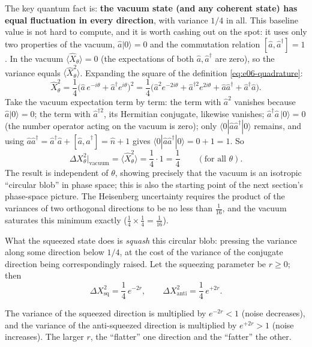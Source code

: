 The key quantum fact is: \textbf{the vacuum state (and any coherent state) has equal fluctuation in every direction}, with variance \(1/4\) in all. This baseline value is not hard to compute, and it is worth cashing out on the spot: it uses only two properties of the vacuum, \(\hat a|0\rangle=0\) and the commutation relation \([\hat a,\hat a^\dagger]=1\). In the vacuum \(\langle\hat X_\theta\rangle=0\) (the expectations of both \(\hat a,\hat a^\dagger\) are zero), so the variance equals \(\langle\hat X_\theta^2\rangle\). Expanding the square of the definition \eqref{eq:e06-quadrature}:
\[
  \hat X_\theta^{2}
  =\frac14\big(\hat a\,e^{-i\theta}+\hat a^\dagger e^{i\theta}\big)^2
  =\frac14\big(\hat a^2 e^{-2i\theta}+\hat a^{\dagger 2}e^{2i\theta}
     +\hat a\hat a^\dagger+\hat a^\dagger\hat a\big).
\]
Take the vacuum expectation term by term: the term with \(\hat a^2\) vanishes because \(\hat a|0\rangle=0\); the term with \(\hat a^{\dagger2}\), its Hermitian conjugate, likewise vanishes; \(\hat a^\dagger\hat a\,|0\rangle=0\) (the number operator acting on the vacuum is zero); only \(\langle 0|\hat a\hat a^\dagger|0\rangle\) remains, and using \(\hat a\hat a^\dagger=\hat a^\dagger\hat a+[\hat a,\hat a^\dagger]=\hat n+1\) gives \(\langle0|\hat a\hat a^\dagger|0\rangle=0+1=1\). So
\[
  \Delta X_\theta^{2}\big|_{\text{vacuum}}=\langle\hat X_\theta^2\rangle
  =\frac14\cdot 1=\frac{1}{4}\qquad(\text{for all }\theta).
\]
The result is independent of \(\theta\), showing precisely that the vacuum is an isotropic ``circular blob'' in phase space; this is also the starting point of the next section's phase-space picture. The Heisenberg uncertainty requires the product of the variances of two orthogonal directions to be no less than \(\tfrac{1}{16}\), and the vacuum saturates this minimum exactly (\(\tfrac14\times\tfrac14=\tfrac1{16}\)).

What the squeezed state does is \emph{squash} this circular blob: pressing the variance along some direction below \(1/4\), at the cost of the variance of the conjugate direction being correspondingly raised. Let the squeezing parameter be \(r\ge0\); then
\begin{equation}
  \Delta X_{\text{sq}}^{2}=\frac{1}{4}\,e^{-2r},
  \qquad
  \Delta X_{\text{anti}}^{2}=\frac{1}{4}\,e^{+2r}.
  \label{eq:e06-squeeze-var}
\end{equation}
\begin{formulaexplain}
The variance of the squeezed direction is multiplied by \(e^{-2r}<1\) (noise decreases), and the variance of the anti-squeezed direction is multiplied by \(e^{+2r}>1\) (noise increases). The larger \(r\), the ``flatter'' one direction and the ``fatter'' the other.
\end{formulaexplain}

